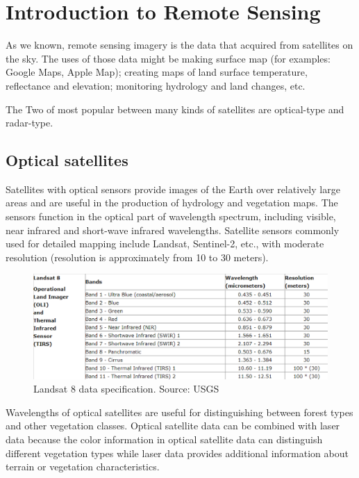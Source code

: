 \section{Introduction to Remote Sensing} %

As we known, remote sensing imagery is the data that acquired from satellites on the sky. The uses of those data might be making surface map (for examples: Google Maps, Apple Map); creating maps of land surface temperature, reflectance and elevation; monitoring hydrology and land changes, etc. 

The Two of most popular between many kinds of satellites are optical-type and radar-type.

\subsection{Optical satellites}

Satellites with optical sensors provide images of the Earth over relatively large areas and are useful in the production of hydrology and vegetation maps. The sensors function in the optical part of wavelength spectrum, including visible, near infrared and short-wave infrared wavelengths. Satellite sensors commonly used for detailed mapping include Landsat, Sentinel-2, etc., with moderate resolution (resolution is approximately from 10 to 30 meters).

\begin{figure}
\centering
\includegraphics[width=0.7\linewidth]{figures/wavelengthL8.png}
\caption{Landsat 8 data specification. Source: USGS}
\end{figure}

Wavelengths of optical satellites are useful for distinguishing between forest types and other vegetation classes. Optical satellite data can be combined with laser data because the color information in optical satellite data can distinguish different vegetation types while laser data provides additional information about terrain or vegetation characteristics. 

